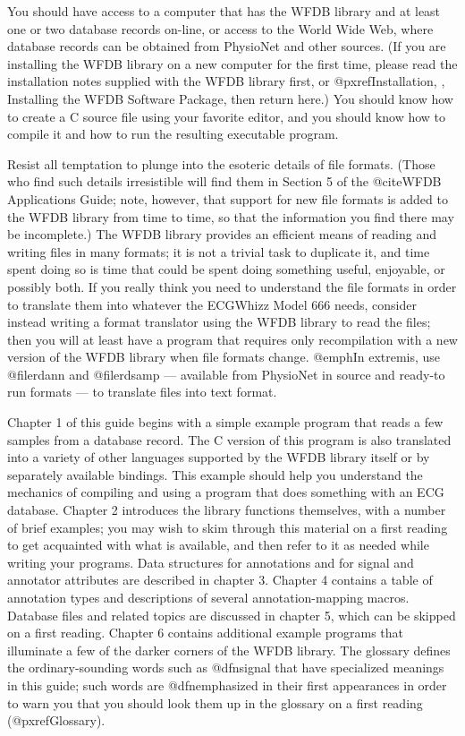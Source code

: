 You should have access to a computer that has the WFDB library and at
least one or two database records on-line, or access to the World Wide Web,
where database records can be obtained from PhysioNet and other sources.  (If
you are installing the WFDB library on a new computer for the first time,
please read the installation notes supplied with the WFDB library first, or
@pxref{Installation, , Installing the WFDB Software Package}, then return
here.)  You should know how to create a C source file using your
favorite editor, and you should know how to compile it and how to run
the resulting executable program.

Resist all temptation to plunge into the esoteric details of file
formats.  (Those who find such details irresistible will find them in
Section 5 of the @cite{WFDB Applications Guide}; note, however, that
support for new file formats is added to the WFDB library from time to
time, so that the information you find there may be incomplete.)  The
WFDB library provides an efficient means of reading and writing files in
many formats; it is not a trivial task to duplicate it, and time spent
doing so is time that could be spent doing something useful, enjoyable,
or possibly both.  If you really think you need to understand the file
formats in order to translate them into whatever the ECGWhizz Model 666
needs, consider instead writing a format translator using the WFDB
library to read the files; then you will at least have a program that
requires only recompilation with a new version of the WFDB library when
file formats change.  @emph{In extremis}, use @file{rdann} and
@file{rdsamp} --- available from PhysioNet in source and ready-to run
formats --- to translate files into text format.

Chapter 1 of this guide begins with a simple example program that reads a few
samples from a database record.  The C version of this program is also
translated into a variety of other languages supported by the WFDB library
itself or by separately available bindings.  This example should help you
understand the mechanics of compiling and using a program that does something
with an ECG database.  Chapter 2 introduces the library functions themselves,
with a number of brief examples; you may wish to skim through this material on
a first reading to get acquainted with what is available, and then refer to it
as needed while writing your programs.  Data structures for annotations and for
signal and annotator attributes are described in chapter 3.  Chapter 4 contains
a table of annotation types and descriptions of several annotation-mapping
macros.  Database files and related topics are discussed in chapter 5, which
can be skipped on a first reading.  Chapter 6 contains additional example
programs that illuminate a few of the darker corners of the WFDB library.  The
glossary defines the ordinary-sounding words such as @dfn{signal} that have
specialized meanings in this guide; such words are @dfn{emphasized} in their
first appearances in order to warn you that you should look them up in the
glossary on a first reading (@pxref{Glossary}).


